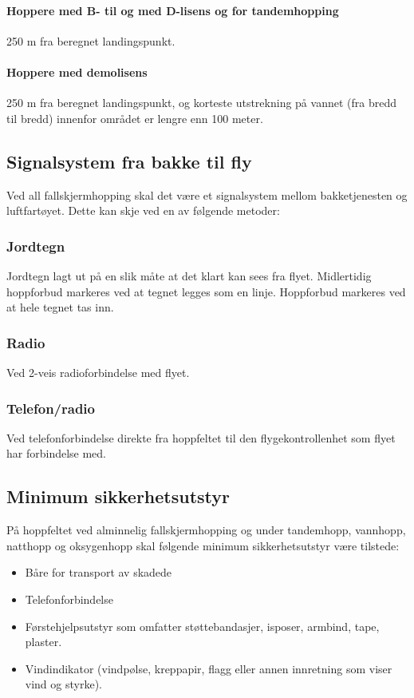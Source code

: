 \paragraph{Hoppere med B- til og med D-lisens og for tandemhopping}
250 m fra beregnet landingspunkt.

\paragraph{Hoppere med demolisens}
250 m fra beregnet landingspunkt, og korteste utstrekning på vannet (fra bredd til bredd) innenfor området er lengre enn 100 meter.

\subsection{Signalsystem fra bakke til fly}
Ved all fallskjermhopping skal det være et signalsystem mellom bakketjenesten og luftfartøyet. Dette kan skje ved en av følgende metoder:

\subsubsection{Jordtegn}
Jordtegn lagt ut på en slik måte at det klart kan sees fra flyet. Midlertidig hoppforbud markeres ved at tegnet legges som en linje. Hoppforbud markeres ved at hele tegnet tas inn.

\subsubsection{Radio}
Ved 2-veis radioforbindelse med flyet.

\subsubsection{Telefon/radio}
Ved telefonforbindelse direkte fra hoppfeltet til den flygekontrollenhet som flyet har forbindelse med.

\subsection{Minimum sikkerhetsutstyr}
På hoppfeltet ved alminnelig fallskjermhopping og under tandemhopp, vannhopp, natthopp og oksygenhopp skal følgende minimum sikkerhetsutstyr være tilstede:
\begin{itemize}
	\item Båre for transport av skadede
	\item Telefonforbindelse
	\item Førstehjelpsutstyr som omfatter støttebandasjer, isposer, armbind, tape, plaster.
	\item Vindindikator (vindpølse, kreppapir, flagg eller annen innretning som viser vind og styrke).
\end{itemize}

